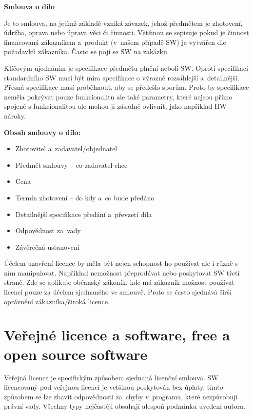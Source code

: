 \begin{Large}
\textbf{Smlouva o dílo}
\end{Large}

Je to smlouva, na jejímž základě vzniká závazek, jehož předmětem je zhotovení, údržba, oprava nebo úprava věci či činnosti. Většinou se sepisuje pokud je činnost financovaná zákazníkem a~produkt (v~našem případě SW) je vytvářen dle požadavků zákazníka. Často se pojí se SW na zakázku.

Klíčovým ujednáním je specifikace předmětu plnění neboli SW\@. Oproti specifikaci standardního SW musí být míra specifikace o výrazně rozsáhlejší a~detailnější. Přesná specifikace musí proběhnout, aby se předešlo sporům. Proto by specifikace neměla pokrývat pouze funkcionalitu ale také parametry, které nejsou přímo spojené s funkcionalitou ale mohou ji zásadně ovlivnit, jako například HW nároky.

\vspace{1cm}
\textbf{Obsah smlouvy o dílo:}
\begin{itemize}[noitemsep]
    \item Zhotovitel a~zadavatel/objednatel
    \item Předmět smlouvy -- co zadavatel chce
    \item Cena
    \item Termín zhotovení -- do kdy a~co bude předáno
    \item Detailnější specifikace předání a~převzetí díla
    \item Odpovědnost za~vady
    \item Závěrečná ustanovení
\end{itemize}

Účelem uzavření licence by měla být nejen schopnost ho používat ale i různě s ním manipulovat. Například nemožnost přeprodávat nebo poskytovat SW třetí straně. Zde se aplikuje občanský zákoník, kde má zákazník možnost používat licenci pouze za účelem sjednaného ve smlouvě. Proto se často sjednává širší oprávnění zákazníka/široká licence. 
\vspace{1cm}








\newpage
\section{Veřejné licence a software, free a open source software}

Veřejná licence je specifickým způsobem sjednaná licenční smlouva. SW licencovaný pod veřejnou licencí je vetšinou poskytován bez úplaty, tímto způsobem se lze zbavit odpovědnosti za~chyby v~programu, které nezpůsobují právní vady. Všechny typy nejčastěji obsahují alespoň podmínku uvedení autora. 
\vspace{0.2cm}

